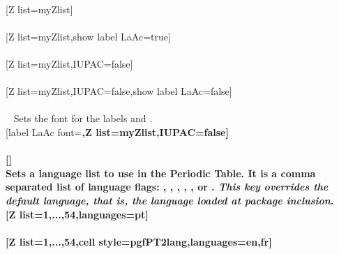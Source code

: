 \pgfPTstyle[show title=false,show legend=false,show group numbers=false]%
\\ [-4pt][Z list=myZlist]%
\\ [5pt]\makebox[\linewidth][c]{\scalebox{.6}{\pgfPT[Z list=myZlist]}}%
\\ [5pt][Z list=myZlist,show label LaAc=true]%
\\ [5pt]\makebox[\linewidth][c]{\scalebox{.6}{\pgfPT[Z list=myZlist,show label LaAc=true]}}%
\\ [5pt][Z list=myZlist,IUPAC=false]%
\\ [5pt]\makebox[\linewidth][c]{\scalebox{.6}{\pgfPT[Z list=myZlist,IUPAC=false]}}%
\\ [5pt][Z list=myZlist,IUPAC=false,show label LaAc=false]%
\\ [5pt]\makebox[\linewidth][c]{\scalebox{.6}{\pgfPT[Z list=myZlist,IUPAC=false,show label LaAc=false]}}%
\\ [5pt]\pgfPTendoption%
\newpage\vspace{-34pt}\ %
\label{option_label LaAc font}%
%
{Sets the font for the labels  and .}%
\\ [5pt][label LaAc font=\string\bfseries,Z list=myZlist,IUPAC=false]%
\\ [10pt]\makebox[\linewidth][c]{\scalebox{.6}{\pgfPT[label LaAc font=\bfseries,Z list=myZlist,IUPAC=false]}}%
\\ [5pt][]%
\pgfPTresetstyle%
\\ [-10pt]\pgfPTendoption%
\vfill
\label{option_languages}%
%
{Sets a language list to use in the Periodic Table. It is a comma separated list of language flags: , , , , ,  or .
\textit{This key overrides the default language, that is, the language loaded at package inclusion}.}%
\\ [5pt][Z list={1,...,54},languages=pt]%
\\ [10pt]\makebox[\linewidth][c]{\scalebox{.6}{\pgfPT[Z list={1,...,54},languages=pt]}}%
\\ [10pt][Z list={1,...,54},cell style=pgfPT2lang,languages={en,fr}]%
\\ [10pt]\makebox[\linewidth][c]{\scalebox{.6}{\pgfPT[Z list={1,...,54},cell style=pgfPT2lang,languages={en,fr}]}}%

